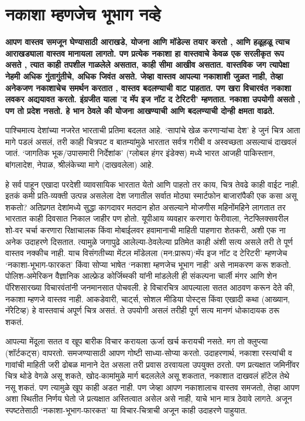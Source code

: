 \chapter{नकाशा म्हणजेच भूभाग नव्हे}

\textcolor{blue!60!black}{\textbf{आपण वास्तव समजून घेण्यासाठी आराखडे, योजना आणि मॉडेल्स तयार करतो , आणि हळूहळू त्याच आराखड्याला वास्तव मानायला लागतो. पण प्रत्येक नकाशा हा वास्तवाचे केवळ एक सरलीकृत रूप असते , त्यात काही तपशील गाळलेले असतात, काही सीमा आखीव असतात. वास्तविक जग त्यापेक्षा नेहमी अधिक गुंतागुंतीचे, अधिक जिवंत असते. जेव्हा वास्तव आपल्या नकाशाशी जुळत नाही, तेव्हा अनेकजण नकाशाचेच समर्थन करतात , वास्तव बदलण्याची वाट पाहतात. पण खरा विचारवंत नकाशा लवकर अद्ययावत करतो. इंग्रजीत याला 'द मॅप इज नॉट द टेरिटरी' म्हणतात. नकाशा उपयोगी असतो , पण तो प्रदेश नसतो. हे भान ठेवले की योजना आखण्याची आणि बदलण्याची दोन्ही क्षमता वाढते.}}

पाश्चिमात्य देशांच्या नजरेत भारताची प्रतिमा बदलत आहे. ‘सापांचे खेळ करणाऱ्यांचा देश’ हे जुनं चित्र आता मागे पडलं असलं, तरी काही चित्रपट व बातम्यांमुळे भारतात सर्वत्र गरीबी व अस्वच्छता असल्याचं दाखवलं जातं. ‘जागतिक भूक/उपासमारी निर्देशांक’ (ग्लोबल हंगर इंडेक्स) मध्ये भारत आजही पाकिस्तान, बांगलादेश, नेपाळ, श्रीलंकेच्या मागे (दाखवलेला) आहे.

हे सर्व पाहून एखादा परदेशी व्यावसायिक भारतात येतो आणि पाहतो तर काय, चित्र तेवढे काही वाईट नाही. इतकं कमी प्रति-व्यक्ती उत्पन्न असलेला देश जगातील सर्वात मोठ्या स्मार्टफोन बाजारांपैकी एक कसा असू शकतो? अतिप्रगत देशांमध्ये सुद्धा कागदावर मतदान होत असल्याने मोजणीस महिनोंमहिने लागतात तर भारतात काही दिवसात निकाल जाहीर पण होतो. यूपीआय व्यवहार करणारा फेरीवाला, नेटफ्लिक्सवरील शो-वर चर्चा करणारा रिक्षाचालक किंवा मोबाईलवर हवामानाची माहिती पाहणारा शेतकरी, अशी एक ना अनेक उदाहरणे दिसतात. त्यामुळे जगापुढे आलेल्या-ठेवलेल्या प्रतिमेत काही अंशी सत्य असले तरी ते पूर्ण वास्तव नक्कीच  नाही. याच विसंगतीच्या मेंटल मॉडेलला (मन:प्रारूप)‘मॅप इज नॉट द टेरिटरी’ म्हणजेच ‘नकाशा-भूभाग-फारकत’ किंवा सोप्या भाषेत ‘नकाशा म्हणजेच भूभाग नाही’ असे नामकरण करू शकतो. पोलिश-अमेरिकन वैज्ञानिक आल्फ्रेड कोर्जिब्स्की यांनी मांडलेली ही संकल्पना चार्ली मंगर आणि शेन पॅरिशसारख्या विचारवंतांनी जनमानसात पोचवली. हे विचारचित्र आपल्याला सतत आठवण करून देते की, नकाशा म्हणजे वास्तव नाही. आकडेवारी, चार्ट्स, सोशल मीडिया पोस्ट्स किंवा एखादी कथा (आख्यान, नॅरेटिव्ह) हे वास्तवाचं अपूर्ण चित्र असतं. ते उपयोगी असलं तरीही पूर्ण सत्य मानणं धोकादायक ठरू शकतं.

आपल्या मेंदूला सतत व खूप बारीक विचार करायला ऊर्जा खर्च करायची नसते. मग तो क्लुप्त्या (शॉर्टकट्स) वापरतो. समजण्यासाठी आपण गोष्टी साध्या-सोप्या करतो. उदाहरणार्थ, नकाशा रस्त्यांची व गावांची माहिती जरी ढोबळ मानाने देत असला तरी प्रवास ठरवायला उपयुक्त ठरतो. पण प्रत्यक्षात जमिनींवर चित्र थोडे वेगळे असू शकते, खोद-कामांमुळे मार्ग बदललेले असू शकतात, नकाशात दाखवलं हॉटेल तेथे नसू शकतं. पण त्यामुळे खूप काही अडत नाही. पण जेव्हा आपण नकाशालाच वास्तव समजतो, तेव्हा आपण अशा स्थितीत निर्णय घेतो जे प्रत्यक्षात अस्तित्वात असेल असे नाही, याचे भान मात्र ठेवावे लागते. अजून स्पष्टतेसाठी ‘नकाशा-भूभाग-फारकत’ या विचार-चित्राची अजून काही उदाहरणे पाहुयात. 

